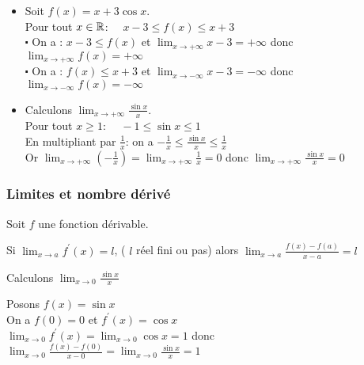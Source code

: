 \begin{example}
\begin{itemize}
\item  Soit $ f(x)= x+ 3\cos x $.\\
Pour tout $x\in\mathbb{R}$:  $\quad x-3\leq f(x)\leq x+3 $ \\
$ \centerdot $  On a : $ x-3\leq f(x)$ et $\displaystyle \lim_{x \to +\infty}x-3=+\infty  $ donc $ \displaystyle \lim_{x \to +\infty}f(x)=+\infty $\\
$ \centerdot $ On a :  $  f(x)\leq x+3$ et $\displaystyle \lim_{x \to -\infty}x-3=-\infty  $ donc $ \displaystyle \lim_{x \to -\infty}f(x)=-\infty $ \\

\item  Calculons $\displaystyle\lim_{x \to +\infty}\frac{\sin x}{x} $.\\

Pour tout $ x\geq 1 $: $\quad  -1\leq\sin x \leq 1 $ \\
En multipliant par $ \frac{1}{x} $: on a $ -\frac{1}{x}\leq \frac{\sin x}{x} \leq\frac{1}{x} $\\
Or $\displaystyle\lim_{x \to +\infty}(-\frac{1}{x})= \displaystyle\lim_{x \to +\infty}\frac{1}{x}=0$ donc $\displaystyle\lim_{x \to +\infty}\frac{\sin x}{x}=0 $
\end{itemize}


\subsubsection*{Limites et nombre dérivé}

\begin{theorem}
Soit $ f $ une fonction dérivable.

Si $\displaystyle \lim_{x \to a}f^{'}(x)=l$,\;  ( $l$ réel fini ou pas) alors $\displaystyle\lim_{x \to a} \frac{f(x)-f(a)}{x-a}=l$
\end{theorem}

\begin{example}
Calculons $\displaystyle\lim_{x \to 0}\frac{\sin x}{x} $

Posons $ f(x)=\sin x $\\
On a $ f(0)=0 $ et  $ f^{'}(x)=\cos x$\\
 $ \displaystyle\lim_{x \to 0}f^{'}(x)=\displaystyle\lim_{x \to 0}\cos x=1 $ donc $\displaystyle \lim_{x \to 0} \frac{f(x)-f(0)}{x-0}=\displaystyle \lim_{x \to 0}\frac{\sin x}{x}=1$
\end{example}


\end{example}
